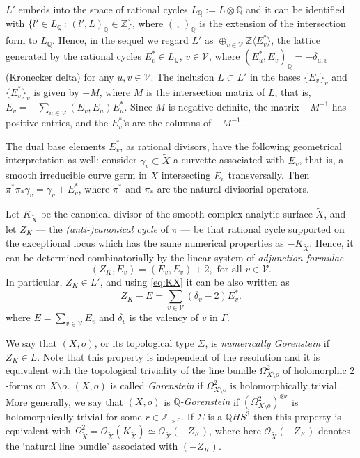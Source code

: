 \documentclass[12pt,a4paper]{amsart}
\def\V{{\mathcal V}}
\def\ZZ{\mathbb{Z}}
\def\QQ{\mathbb{Q}}
\def\cO{\mathcal{O}}
\def\ZK{Z_K}
\theoremstyle{remark}
\theoremstyle{definition}
\begin{document}
$L'$ embeds into the space of rational cycles $L_{{\mathbb Q}}:=
 L\otimes {\mathbb Q}$ and it can be identified  with $\{l'\in L_{{\mathbb Q}}\,:\, (l',L)_{{\mathbb Q}}\in \ZZ\}$, where $(\,,\,)_{{\mathbb Q}}$  is the extension of the intersection form to $L_{{\mathbb Q}}$. Hence, in the sequel we regard $L'$ as $\oplus_{v\in \V} \ZZ\langle E^*_v \rangle$,
 the lattice generated by the rational cycles  $E^*_v\in L_{{\QQ}}$,
$v\in \V$,  where $(E_u^*,E_v)_{{\QQ}}=-\delta_{u,v}$ (Kronecker delta) for any $u,v\in \V$.
 The inclusion $L\subset L'$  in the bases $\{E_v\}_v$ and $\{E_v^*\}_v$  is given by
$-M$, where $M$ is the intersection matrix of $L$, that is,
$E_v=-\sum_{u\in \V} (E_v,E_u) E_u^*$. Since $M$ is negative definite, the matrix  $-M^{-1}$
has  positive  entries, and the   $E^*_v$'s   are the columns of  $-M^{-1}$.

The dual base elements $E^*_v$, as rational divisors,  have the following
geometrical interpretation as well: consider $\gamma_v\subset \tilde X$ a curvette associated with $E_v$, that is, a smooth
irreducible curve germ in $\tilde X$ intersecting $E_v$ transversally. Then
$\pi^*\pi_*\gamma_v=\gamma_v+E_v^*$, where $\pi^*$ and $\pi_*$ are the natural divisorial operators. 

Let $K_{\tilde X}$ be the canonical divisor of  the smooth complex analytic surface $\tilde X$, 
and let $Z_K$  --- the {\it (anti-)canonical cycle} of $\pi$ --- be that rational cycle  supported on the exceptional locus which has the same numerical properties as $-K_{\tilde{X}}$.
Hence, it can be  determined combinatorially  by the
linear system of {\it adjunction formulae}
\begin{equation}
\label{eq:KX}
(Z_K,E_v)=(E_v,E_v)+2, \textrm{ for all } v\in \V.
\end{equation}
In particular, $Z_K\in L'$, and using \eqref{eq:KX} it can be also written as
\begin{equation}\label{eq:ZK}
\ZK-E=\sum_{v\in \V} (\delta_v-2) E^*_v.
\end{equation}
where $E=\sum_{v\in \V}E_v$ and $\delta_v$ is the valency of $v$ in $\Gamma$.

We say that $(X,o)$, or its topological type $\Sigma$, is \emph{numerically Gorenstein} if $Z_K\in L$. Note that this property is independent of the resolution and it  is equivalent with the topological triviality  of the line bundle $\Omega^2_{X\setminus o}$ of holomorphic $2$-forms on $X\setminus o$. $(X,o)$ is called \emph{Gorenstein} if $\Omega^2_{X\setminus o}$ is holomorphically trivial.
More generally,  we say that $(X,o)$ is \emph{$\mathbb{Q}$-Gorenstein} if 
$(\Omega^2_{X\setminus o})^{\otimes r}$ is holomorphically trivial 
for some $r\in \mathbb{Z}_{>0}$. If $\Sigma$ is a $\mathbb{Q}HS^3$ then this property is equivalent with $\Omega^2_{\tilde X}=\cO_{\tilde X}(K_{\tilde X})\simeq \cO_{\tilde X}(-Z_K)$, where 
here $ \cO_{\tilde X}(-Z_K)$ denotes the 
`natural line bundle' associated with $(-Z_K)$.
\end{document}
